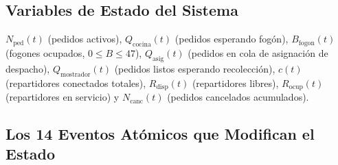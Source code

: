 \documentclass[11pt,letterpaper]{article}
\begin{document}
\subsection{Variables de Estado del Sistema}
$N_{\text{ped}}(t)$ (pedidos activos), $Q_{\text{cocina}}(t)$ (pedidos esperando fogón), $B_{\text{fogon}}(t)$ (fogones ocupados, $0 \le B \le 47$), $Q_{\text{asig}}(t)$ (pedidos en cola de asignación de despacho), $Q_{\text{mostrador}}(t)$ (pedidos listos esperando recolección), $c(t)$ (repartidores conectados totales), $R_{\text{disp}}(t)$ (repartidores libres), $R_{\text{ocup}}(t)$ (repartidores en servicio) y $N_{\text{canc}}(t)$ (pedidos cancelados acumulados).

\subsection{Los 14 Eventos Atómicos que Modifican el Estado}
\end{document}

